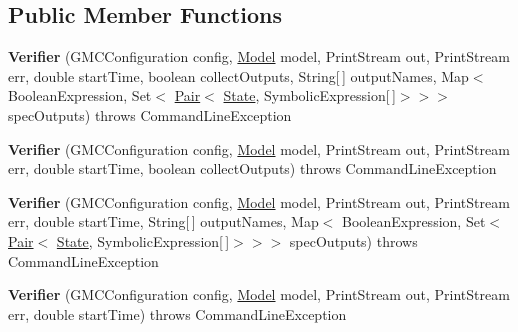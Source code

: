 \subsection*{Public Member Functions}
\begin{DoxyCompactItemize}
\item 
\hypertarget{classedu_1_1udel_1_1cis_1_1vsl_1_1civl_1_1run_1_1IF_1_1Verifier_aba7f80c61fc0669112d7ef2363133f4e}{}{\bfseries Verifier} (G\+M\+C\+Configuration config, \hyperlink{interfaceedu_1_1udel_1_1cis_1_1vsl_1_1civl_1_1model_1_1IF_1_1Model}{Model} model, Print\+Stream out, Print\+Stream err, double start\+Time, boolean collect\+Outputs, String\mbox{[}$\,$\mbox{]} output\+Names, Map$<$ Boolean\+Expression, Set$<$ \hyperlink{classedu_1_1udel_1_1cis_1_1vsl_1_1civl_1_1util_1_1IF_1_1Pair}{Pair}$<$ \hyperlink{interfaceedu_1_1udel_1_1cis_1_1vsl_1_1civl_1_1state_1_1IF_1_1State}{State}, Symbolic\+Expression\mbox{[}$\,$\mbox{]}$>$$>$$>$ spec\+Outputs)  throws Command\+Line\+Exception \label{classedu_1_1udel_1_1cis_1_1vsl_1_1civl_1_1run_1_1IF_1_1Verifier_aba7f80c61fc0669112d7ef2363133f4e}

\item 
\hypertarget{classedu_1_1udel_1_1cis_1_1vsl_1_1civl_1_1run_1_1IF_1_1Verifier_a81e820659044972af8ad177020afeef2}{}{\bfseries Verifier} (G\+M\+C\+Configuration config, \hyperlink{interfaceedu_1_1udel_1_1cis_1_1vsl_1_1civl_1_1model_1_1IF_1_1Model}{Model} model, Print\+Stream out, Print\+Stream err, double start\+Time, boolean collect\+Outputs)  throws Command\+Line\+Exception \label{classedu_1_1udel_1_1cis_1_1vsl_1_1civl_1_1run_1_1IF_1_1Verifier_a81e820659044972af8ad177020afeef2}

\item 
\hypertarget{classedu_1_1udel_1_1cis_1_1vsl_1_1civl_1_1run_1_1IF_1_1Verifier_a9eae70f567ab041380c1c019381bdb80}{}{\bfseries Verifier} (G\+M\+C\+Configuration config, \hyperlink{interfaceedu_1_1udel_1_1cis_1_1vsl_1_1civl_1_1model_1_1IF_1_1Model}{Model} model, Print\+Stream out, Print\+Stream err, double start\+Time, String\mbox{[}$\,$\mbox{]} output\+Names, Map$<$ Boolean\+Expression, Set$<$ \hyperlink{classedu_1_1udel_1_1cis_1_1vsl_1_1civl_1_1util_1_1IF_1_1Pair}{Pair}$<$ \hyperlink{interfaceedu_1_1udel_1_1cis_1_1vsl_1_1civl_1_1state_1_1IF_1_1State}{State}, Symbolic\+Expression\mbox{[}$\,$\mbox{]}$>$$>$$>$ spec\+Outputs)  throws Command\+Line\+Exception \label{classedu_1_1udel_1_1cis_1_1vsl_1_1civl_1_1run_1_1IF_1_1Verifier_a9eae70f567ab041380c1c019381bdb80}

\item 
\hypertarget{classedu_1_1udel_1_1cis_1_1vsl_1_1civl_1_1run_1_1IF_1_1Verifier_ad665bdc79b46b9148b846b2f19bed1b8}{}{\bfseries Verifier} (G\+M\+C\+Configuration config, \hyperlink{interfaceedu_1_1udel_1_1cis_1_1vsl_1_1civl_1_1model_1_1IF_1_1Model}{Model} model, Print\+Stream out, Print\+Stream err, double start\+Time)  throws Command\+Line\+Exception \label{classedu_1_1udel_1_1cis_1_1vsl_1_1civl_1_1run_1_1IF_1_1Verifier_ad665bdc79b46b9148b846b2f19bed1b8}


\end{DoxyCompactItemize}
